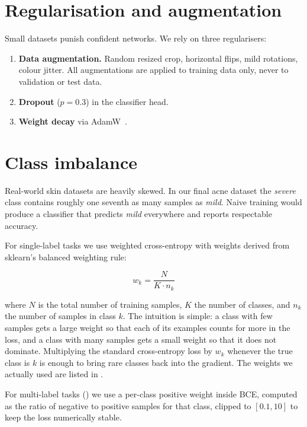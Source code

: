 \documentclass[11pt,a4paper,oneside]{report}
\begin{document}
\section{Regularisation and augmentation}

Small datasets punish confident networks. We rely on three
regularisers:

\begin{enumerate}
    \item \textbf{Data augmentation.} Random resized crop, horizontal
        flips, mild rotations, colour jitter. All augmentations are
        applied to training data only, never to validation or test
        data.
    \item \textbf{Dropout} (\(p=0.3\)) in the classifier head.
    \item \textbf{Weight decay} via AdamW~\cite{loshchilov2019adamw}.
\end{enumerate}

\section{Class imbalance}\label{sec:imbalance}

Real-world skin datasets are heavily skewed. In our final acne
dataset the \emph{severe} class contains roughly one seventh as many
samples as \emph{mild}. Naive training would produce a classifier
that predicts \emph{mild} everywhere and reports respectable
accuracy.

For single-label tasks we use weighted cross-entropy with weights
derived from sklearn's balanced weighting rule:

\begin{equation}
    w_k = \frac{N}{K \cdot n_k}
    \label{eq:weights}
\end{equation}

where \(N\) is the total number of training samples, \(K\) the number
of classes, and \(n_k\) the number of samples in class \(k\). The
intuition is simple: a class with few samples gets a large weight so
that each of its examples counts for more in the loss, and a class
with many samples gets a small weight so that it does not dominate.
Multiplying the standard cross-entropy loss by \(w_k\) whenever the
true class is \(k\) is enough to bring rare classes back into the
gradient. The weights we actually used are listed in .

For multi-label tasks () we use a
per-class positive weight inside BCE, computed as the ratio of
negative to positive samples for that class, clipped to
\([0.1, 10]\) to keep the loss numerically stable.
\end{document}
